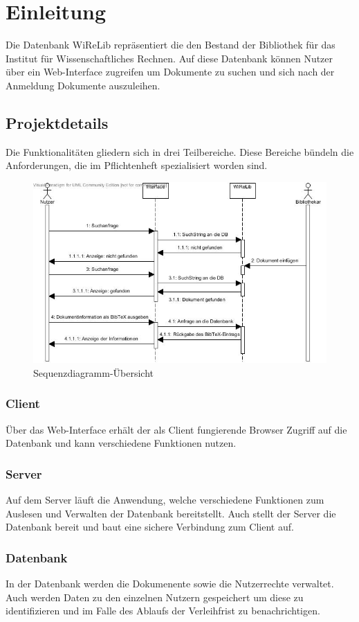 
\chapter{Einleitung}
Die Datenbank WiReLib repräsentiert die den Bestand der Bibliothek für das Institut für Wissenschaftliches Rechnen.
Auf diese Datenbank können Nutzer über ein Web-Interface zugreifen um Dokumente zu suchen und sich nach der Anmeldung Dokumente auszuleihen.

\section{Projektdetails}
Die Funktionalitäten gliedern sich in drei Teilbereiche.
Diese Bereiche bündeln die Anforderungen, die im Pflichtenheft spezialisiert
worden sind.

\begin{figure}[h]
\includegraphics[width=0.8\linewidth]{bilder/Sequenz-Übersicht.jpg}
\caption[Sequenzdiagramm-Übersicht]{Sequenzdiagramm-Übersicht}
\label{Sequenzdiagramm-Übersicht}
\end{figure}

\subsection{Client}
Über das Web-Interface erhält der als Client fungierende Browser Zugriff auf die Datenbank und kann verschiedene Funktionen nutzen.

\subsection{Server}
Auf dem Server läuft die Anwendung, welche verschiedene Funktionen zum Auslesen und Verwalten der Datenbank bereitstellt. 
Auch stellt der Server die Datenbank bereit und baut eine sichere Verbindung zum Client auf.

\subsection{Datenbank}
In der Datenbank werden die Dokumenente sowie die Nutzerrechte verwaltet.
Auch werden Daten zu den einzelnen Nutzern gespeichert um diese zu identifizieren und im Falle des Ablaufs der Verleihfrist zu benachrichtigen.
